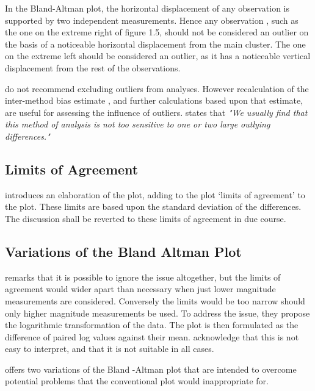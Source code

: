 \documentclass{report}
\begin{document}

In the Bland-Altman plot, the horizontal displacement of any
observation is supported by two independent measurements. Hence
any observation , such as the one on the extreme right of figure
1.5, should not be considered an outlier on the basis of a
noticeable horizontal displacement from the main cluster. The one
on the extreme left should be considered an outlier, as it has a
noticeable vertical displacement from the rest of the
observations.

\citet*{BA99} do not recommend excluding outliers from analyses.
However recalculation of the inter-method bias estimate , and
further calculations based upon that estimate, are useful for
assessing the influence of outliers.\citep{BA99} states that
\emph{"We usually find that this method of analysis is not too
	sensitive to one or two large outlying differences."}

\subsection{Limits of Agreement}
\citet{BA86} introduces an elaboration of the plot, adding to the
plot `limits of agreement' to the plot. These limits are based
upon the standard deviation of the differences. The discussion
shall be reverted to these limits of agreement in due course.

\subsection{Variations of the Bland Altman Plot}
\citet{BA99} remarks that it is possible to ignore the issue
altogether, but the limits of agreement would wider apart than
necessary when just lower magnitude measurements are considered.
Conversely the limits would be too narrow should only higher
magnitude measurements be used. To address the issue, they propose
the logarithmic transformation of the data. The plot is then
formulated as the difference of paired log values against their
mean. \citet{BA99} acknowledge that this is not easy to interpret,
and that it is not suitable in all cases.

\citet{BA99} offers two variations of the Bland -Altman plot that
are intended to overcome potential problems that the conventional
plot would inappropriate for.
\end{document}
